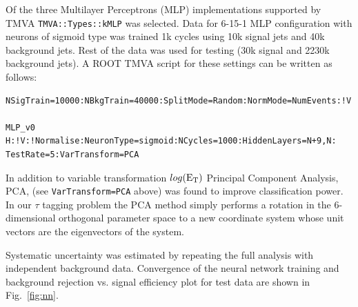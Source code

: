 \documentclass[a4paper]{jpconf}
\begin{document}




Of the three Multilayer Perceptrons (MLP) implementations supported by TMVA
{\tt TMVA::Types::kMLP} was selected.
Data for 6-15-1 MLP configuration with neurons of sigmoid type was trained 1k cycles using
10k signal jets and 40k background jets. 
Rest of the data was used for testing (30k signal and 2230k background jets).
A ROOT TMVA script for these settings can be written as follows:
 
\begin{verbatim}
NSigTrain=10000:NBkgTrain=40000:SplitMode=Random:NormMode=NumEvents:!V

MLP_v0  H:!V:!Normalise:NeuronType=sigmoid:NCycles=1000:HiddenLayers=N+9,N:
TestRate=5:VarTransform=PCA
\end{verbatim}

In addition to variable transformation $log({\rm E}_{\rm T})$ 
Principal Component Analysis, PCA, (see {\tt  VarTransform=PCA} above) was found to improve 
classification power.
In our $\tau$ tagging problem the PCA method simply performs a rotation 
in the 6-dimensional orthogonal parameter space to a new coordinate system whose unit vectors
are the eigenvectors of the system. 


Systematic uncertainty was estimated by repeating the full analysis with independent background data.
Convergence of the neural network training and 
background rejection vs. signal efficiency plot  for test data are shown in Fig.~\ref{fig:nn}.
\end{document}
